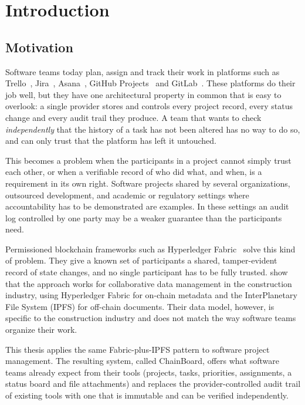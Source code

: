 \chapter{Introduction}
\label{ch:introduction}

\section{Motivation}
\label{sec:motivation}

Software teams today plan, assign and track their work in platforms such as Trello~\cite{trello}, Jira~\cite{jira}, Asana~\cite{asana}, GitHub Projects~\cite{github} and GitLab~\cite{gitlab}. These platforms do their job well, but they have one architectural property in common that is easy to overlook: a single provider stores and controls every project record, every status change and every audit trail they produce. A team that wants to check \emph{independently} that the history of a task has not been altered has no way to do so, and can only trust that the platform has left it untouched.

This becomes a problem when the participants in a project cannot simply trust each other, or when a verifiable record of who did what, and when, is a requirement in its own right. Software projects shared by several organizations, outsourced development, and academic or regulatory settings where accountability has to be demonstrated are examples. In these settings an audit log controlled by one party may be a weaker guarantee than the participants need.

Permissioned blockchain frameworks such as Hyperledger Fabric~\cite{androulaki2018} solve this kind of problem. They give a known set of participants a shared, tamper-evident record of state changes, and no single participant has to be fully trusted. \textcite{adel2023} show that the approach works for collaborative data management in the construction industry, using Hyperledger Fabric for on-chain metadata and the InterPlanetary File System (IPFS) for off-chain documents. Their data model, however, is specific to the construction industry and does not match the way software teams organize their work.

This thesis applies the same Fabric-plus-IPFS pattern to software project management. The resulting system, called ChainBoard, offers what software teams already expect from their tools (projects, tasks, priorities, assignments, a status board and file attachments) and replaces the provider-controlled audit trail of existing tools with one that is immutable and can be verified independently.

